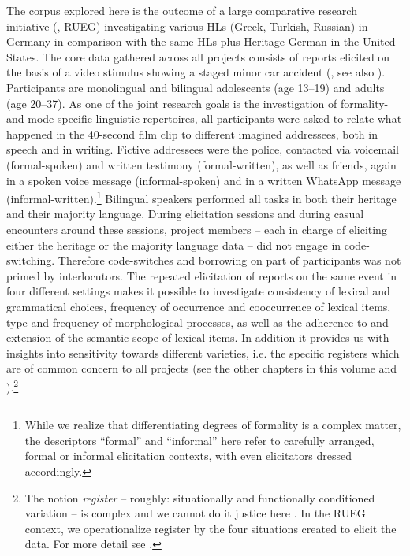 \documentclass[output=paper,colorlinks,citecolor=brown]{langscibook}
\begin{document}
The corpus explored here is the outcome of a large comparative research initiative (\citealt{RUEGcorpus2024}, RUEG) investigating various HLs (Greek, Turkish, Russian) in Germany in comparison with the same HLs plus Heritage German in the United States. The core data gathered across all projects consists of reports elicited on the basis of a video stimulus showing a staged minor car accident (\citealt{Wiese2020LanguageSituations}, see also \cite{chapters/02}). Participants are monolingual and bilingual adolescents (age 13--19) and adults (age 20--37). As one of the joint research goals is the investigation of formality- and mode-specific linguistic repertoires, all participants were asked to relate what happened in the 40-second film clip to different imagined addressees, both in speech and in writing. Fictive addressees were the police, contacted via voicemail (formal-spoken) and written testimony (formal-written), as well as friends, again in a spoken voice message (informal-spoken) and in a written WhatsApp message (informal-written).\footnote{While we realize that differentiating degrees of formality is a complex matter, the descriptors ``formal'' and ``informal'' here refer to carefully arranged, formal or informal elicitation contexts, with even elicitators dressed accordingly.} Bilingual speakers performed all tasks in both their heritage and their majority language. During elicitation sessions and during casual encounters around these sessions, project members –  each in charge of eliciting either the heritage or the majority language data – did not engage in code-switching. Therefore code-switches and borrowing on part of participants was not primed by interlocutors. The repeated elicitation of reports on the same event in four different settings makes it possible to investigate consistency of lexical and grammatical choices, frequency of occurrence and cooccurrence of lexical items, type and frequency of morphological processes, as well as the adherence to and extension of the semantic scope of lexical items. In addition it provides us with insights into sensitivity towards different varieties, i.e. the specific registers which are of common concern to all projects (see the other chapters in this volume and \citealt{TsehayeEtAl2021,WieseEtAl2022, PashkovaEtAl2022}).\footnote{The notion \textit{register} -- roughly: situationally and functionally conditioned variation -- is complex and we cannot do it justice here \citep{BiberConrad2009RegisterGenreStyle, EgbertBiber2018RegiterVariation,Matthiessen2019Register, Lüdeling2022Register}. In the RUEG context, we operationalize register by the four situations created to elicit the data. For more detail see .}
\end{document}
